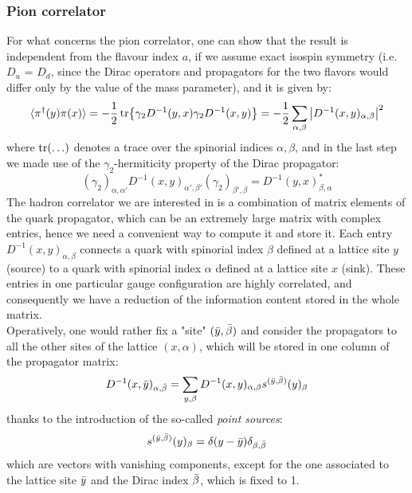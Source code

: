 \subsubsection*{Pion correlator}
For what concerns the pion correlator, one can show that the result is independent from the flavour index $a$, if we assume exact isospin symmetry (i.e. $D_u$ = $D_d$, since the Dirac operators and propagators for the two flavors would differ only by the value of the mass parameter), and it is given by:
\begin{equation}\label{pion tp}
    \langle \pi^\dagger(y) \pi(x) \rangle = - \frac{1}{2}\tr{\gamma_2 D^{-1}(y, x) \gamma_2 D^{-1}(x, y)} = - \frac{1}{2} \sum_{\alpha, \beta} \abs{D^{-1}(x, y)_{\alpha, \beta}}^2   
\end{equation}
where $\tr(\dots)$ denotes a trace over the spinorial indices $\alpha, \beta$, and in the last step we made use of the $\gamma_2$-hermiticity property of the Dirac propagator:
\begin{equation}
    (\gamma_2)_{\alpha, \alpha'} D^{-1}(x, y)_{\alpha', \beta'}(\gamma_2)_{\beta', \beta} = D^{-1}(y, x)_{\beta, \alpha}^*
\end{equation}
The hadron correlator we are interested in is a combination of matrix elements of the quark propagator, which can be an extremely large matrix with complex entries, hence we need a convenient way to compute it and store it. Each entry $D^{-1}(x,y)_{\alpha, \beta}$ connects a quark with spinorial index $\beta$ defined at a lattice site $y$ (source) to a quark with spinorial index $\alpha$ defined at a lattice site $x$ (sink). These entries in one particular gauge configuration are highly correlated, and consequently we have a reduction of the information content stored in the whole matrix. 
\\ Operatively, one would rather fix a "site" $(\Bar{y}, \Bar{\beta})$ and consider the propagators to all the other sites of the lattice $(x, \alpha)$, which will be stored in one column of the propagator matrix:
\begin{equation}
    D^{-1}(x, \Bar{y})_{\alpha, \Bar{\beta}} = \sum_{y, \beta} D^{-1}(x, y)_{\alpha, \beta} s^{(\Bar{y}, \Bar{\beta})}(y)_{\beta}
\end{equation}
thanks to the introduction of the so-called \textit{point sources}:
\begin{equation}
    s^{(\Bar{y}, \Bar{\beta})}(y)_\beta = \delta(y - \Bar{y}) \delta_{\beta, \Bar{\beta}}
\end{equation}
which are vectors with vanishing components, except for the one associated to the lattice site $\Bar{y}$ and the Dirac index $\Bar{\beta}$, which is fixed to 1.
